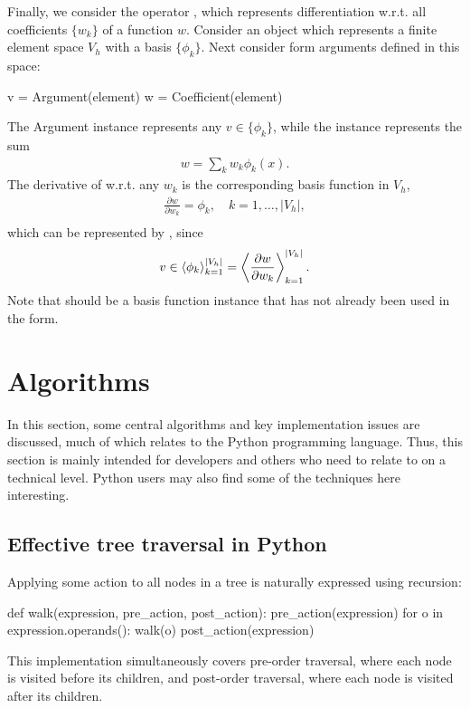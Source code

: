 Finally, we consider the operator , which represents
differentiation w.r.t. all coefficients $\{w_k\}$ of a function $w$.
Consider an object  which represents a finite element space
$V_h$ with a basis $\{\phi_k\}$.  Next consider form arguments defined
in this space:
\begin{uflcode}
v = Argument(element)
w = Coefficient(element)
\end{uflcode}
The Argument instance  represents any $v\in\{\phi_k\}$,
while the  instance  represents the sum
\begin{align}
w = \sum_k w_k \phi_k(x).
\end{align}
The derivative of  w.r.t. any $w_k$ is the corresponding basis
function in $V_h$,
\begin{align}
\frac{\partial w}{\partial w_k} = \phi_k, \quad k = 1, \ldots, |V_h|, \\
\end{align}
which can be represented by , since
\begin{align}
v \in \left\langle{ \phi_k }\right\rangle_{k=1}^{|V_h|} = \left\langle{ \frac{\partial w}{\partial w_k} }\right\rangle_{k=1}^{|V_h|}.
\end{align}
Note that  should be a basis function instance that has not
already been used in the form.

\section{Algorithms}
\label{ufl:sec:algorithms}

In this section, some central algorithms and key implementation issues
are discussed, much of which relates to the Python programming language.
Thus, this section is mainly intended for developers and others who need
to relate to \ufl{} on a technical level.  Python users may also find
some of the techniques here interesting.

\subsection{Effective tree traversal in Python}
\label{ufl:sec:traversal}


Applying some action to all nodes in a tree is naturally expressed
using recursion:
\begin{python}
def walk(expression, pre_action, post_action):
    pre_action(expression)
    for o in expression.operands():
        walk(o)
    post_action(expression)
\end{python}
This implementation simultaneously covers pre-order traversal, where
each node is visited before its children, and post-order traversal,
where each node is visited after its children.

